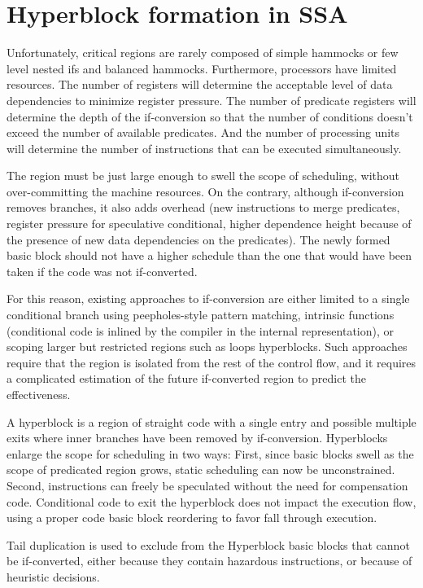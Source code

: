 \section{Hyperblock formation in SSA}

Unfortunately, critical regions are rarely composed of simple hammocks or few level nested ifs and balanced hammocks. Furthermore, processors have limited resources. The number of registers will determine the acceptable level of data dependencies to minimize register pressure. The number of predicate registers will determine the depth of the if-conversion so that the number of conditions doesn't exceed the number of available predicates. And the number of processing units will determine the number of instructions that can be executed simultaneously.

The region must be just large enough to swell the scope of scheduling, without over-committing the machine resources. On the contrary, although if-conversion removes branches, it also adds overhead (new instructions to merge predicates, register pressure for speculative conditional, higher dependence height because of the presence of new data dependencies on the predicates). The newly formed basic block should not have a higher schedule than the one that would have been taken if the code was not if-converted.

For this reason, existing approaches to if-conversion are either limited to a single conditional branch using peepholes-style pattern matching, intrinsic functions (conditional code is inlined by the compiler in the internal representation), or scoping larger but restricted regions such as loops hyperblocks. Such approaches require that the region is isolated from the rest of the control flow, and it requires a complicated estimation of the future if-converted region to predict the effectiveness.

A hyperblock is a region of straight code with a single entry and possible multiple exits where inner branches have been removed by if-conversion.
Hyperblocks enlarge the scope for scheduling in two ways: First, since basic blocks swell as the scope of predicated region grows, static scheduling can now be unconstrained. Second, instructions can freely be speculated without the need for compensation code. Conditional code to exit the hyperblock does not impact the execution flow, using a proper code basic block reordering to favor fall through execution.

Tail duplication is used to exclude from the Hyperblock basic blocks that cannot be if-converted, either because they contain hazardous instructions, or because of heuristic decisions.

